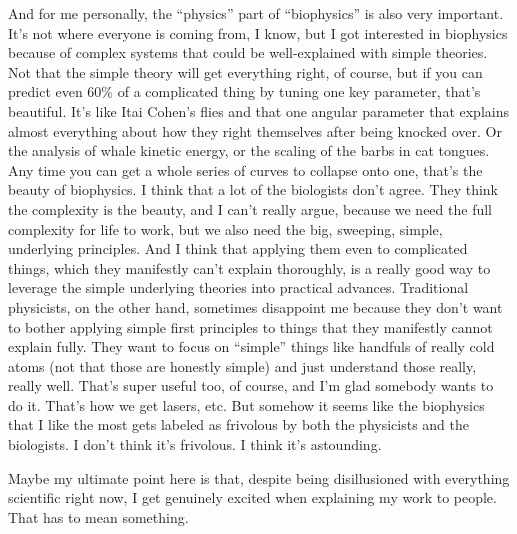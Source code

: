 {And for me personally, the ``physics'' part of ``biophysics'' is also very important.  It's not where everyone is coming from, I know, but I got interested in biophysics because of complex systems that could be well-explained with simple theories.  Not that the simple theory will get everything right, of course, but if you can predict even 60\% of a complicated thing by tuning one key parameter, that's beautiful.  It's like Itai Cohen's flies and that one angular parameter that explains almost everything about how they right themselves after being knocked over.  Or the analysis of whale kinetic energy, or the scaling of the barbs in cat tongues.  Any time you can get a whole series of curves to collapse onto one, that's the beauty of biophysics.  I think that a lot of the biologists don't agree.  They think the complexity is the beauty, and I can't really argue, because we need the full complexity for life to work, but we also need the big, sweeping, simple, underlying principles.  And I think that applying them even to complicated things, which they manifestly can't explain thoroughly, is a really good way to leverage the simple underlying theories into practical advances.  Traditional physicists, on the other hand, sometimes disappoint me because they don't want to bother applying simple first principles to things that they manifestly cannot explain fully.  They want to focus on ``simple'' things like handfuls of really cold atoms (not that those are honestly simple) and just understand those really, really well.  That's super useful too, of course, and I'm glad somebody wants to do it.  That's how we get lasers, etc.  But somehow it seems like the biophysics that I like the most gets labeled as frivolous by both the physicists and the biologists.  I don't think it's frivolous.  I think it's astounding.

Maybe my ultimate point here is that, despite being disillusioned with everything scientific right now, I get genuinely excited when explaining my work to people.  That has to mean something.


}
